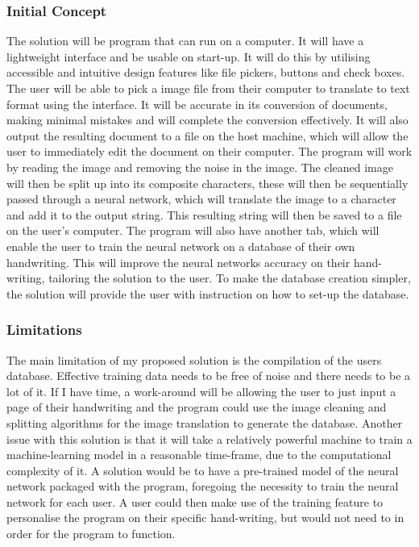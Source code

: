 \documentclass{report}
\begin{document}
\subsubsection{Initial Concept}
The solution will be program that can run on a computer. It will have a lightweight interface and be usable on start-up. It will do this by utilising accessible and intuitive design features like file pickers, buttons and check boxes. The user will be able to pick a image file from their computer to translate to text format using the interface. It will be accurate in its conversion of documents, making minimal mistakes and  will complete the conversion effectively. It will also output the resulting document to a file on the host machine, which will allow the user to immediately edit the document on their computer.
\newline
The program will work by reading the image and removing the noise in the image. The cleaned image will then be split up into its composite characters, these will then be sequentially passed through a neural network, which will translate the image to a character and add it to the output string. This resulting string will then be saved to a file on the user's computer.
\newline
The program will also have another tab, which will enable the user to train the neural network on a database of their own handwriting. This will improve the neural networks accuracy on their hand-writing, tailoring the solution to the user. To make the database creation simpler, the solution  will provide the user with instruction on how to set-up the database.

\subsubsection{Limitations}
The main limitation of my proposed solution is the compilation of the users database. Effective training data needs to be free of noise and there needs to be a lot of it. If I have time, a work-around will be allowing the user to just input a page of their handwriting and the program could use the image cleaning and splitting algorithms for the image translation to generate the database.
\newline
Another issue with this  solution is that it will take a relatively powerful machine to train a machine-learning model in a reasonable time-frame, due to the computational complexity of it. A solution would be to have a pre-trained model of the neural network packaged with the program, foregoing the necessity to train the neural network for each user. A user could then make use of the training feature to personalise the program on their specific hand-writing, but would not need to in order for the program to function.
\newpage
\end{document}
